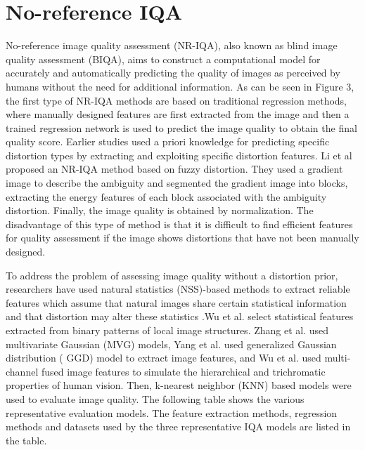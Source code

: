 \documentclass{article}
\begin{document}
\section{No-reference IQA}
\label{NR-IQA}

No-reference image quality assessment (NR-IQA), also known as blind image quality assessment (BIQA), aims to construct a computational model for accurately and automatically predicting the quality of images as perceived by humans without the need for additional information. As can be seen in Figure 3, the first type of NR-IQA methods are based on traditional regression methods, where manually designed features are first extracted from the image and then a trained regression network is used to predict the image quality to obtain the final quality score. Earlier studies used a priori knowledge for predicting specific distortion types \cite{li2015no,liu2009no} by extracting and exploiting specific distortion features. Li et al \cite{liu2009no} proposed an NR-IQA method based on fuzzy distortion. They used a gradient image to describe the ambiguity and segmented the gradient image into blocks, extracting the energy features of each block associated with the ambiguity distortion. Finally, the image quality is obtained by normalization. The disadvantage of this type of method is that it is difficult to find efficient features for quality assessment if the image shows distortions that have not been manually designed.

To address the problem of assessing image quality without a distortion prior, researchers have used natural statistics (NSS)-based methods to extract reliable features which assume that natural images share certain statistical information and that distortion may alter these statistics \cite{wu2015highly,zhang2015feature,wu2015blind,yang2018blind,ji2019blind,wu2017blind,zhou2019no}.Wu et al. select statistical features extracted from binary patterns of local image structures. Zhang et al. used multivariate Gaussian (MVG) models, Yang et al. used generalized Gaussian distribution ( GGD) model to extract image features, and Wu et al. used multi-channel fused image features to simulate the hierarchical and trichromatic properties of human vision. Then, k-nearest neighbor (KNN) based models were used to evaluate image quality. The following table shows the various representative evaluation models. The feature extraction methods, regression methods and datasets used by the three representative IQA models are listed in the table.
\end{document}
